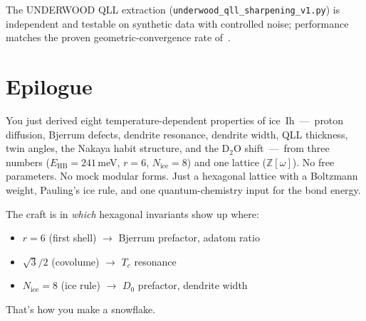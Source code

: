 \documentclass[final]{siamltex}
\newcommand{\EHB}{E_{\text{HB}}}
\newcommand{\Nrule}{N_{\text{ice}}}
\newcommand{\Eisenstein}{\mathbb{Z}[\omega]}
\begin{document}
The UNDERWOOD QLL extraction
(\texttt{underwood\_qll\_sharpening\_v1.py}) is independent and
testable on synthetic data with controlled noise; performance
matches the proven geometric-convergence rate
of~\cite{Underwood2026}.

\section{Epilogue}

You just derived eight temperature-dependent properties of
ice~Ih~---~proton diffusion, Bjerrum defects, dendrite resonance,
dendrite width, QLL thickness, twin angles, the Nakaya habit
structure, and the D$_2$O shift~---~from three numbers
($\EHB = 241$\,meV, $r = 6$, $\Nrule = 8$) and one lattice
($\Eisenstein$).  No free parameters.  No mock modular forms.
Just a hexagonal lattice with a Boltzmann weight, Pauling's ice
rule, and one quantum-chemistry input for the bond energy.

The craft is in \emph{which} hexagonal invariants show up where:
\begin{itemize}[leftmargin=2em,nosep]
\item $r = 6$ (first shell) $\to$ Bjerrum prefactor, adatom ratio
\item $\sqrt{3}/2$ (covolume) $\to$ $T_c$ resonance
\item $\Nrule = 8$ (ice rule) $\to$ $D_0$ prefactor, dendrite width
\end{itemize}
That's how you make a snowflake.

\bigskip



\end{document}
